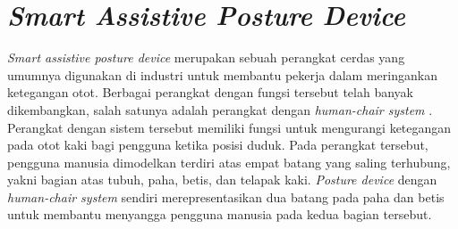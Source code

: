 \section{\emph{Smart Assistive Posture Device}}
\label{sec:assistivedevice}

\emph{Smart assistive posture device} merupakan sebuah perangkat cerdas yang umumnya digunakan di industri untuk membantu pekerja dalam meringankan ketegangan otot.
Berbagai perangkat dengan fungsi tersebut telah banyak dikembangkan,
  salah satunya adalah perangkat dengan \emph{human-chair system} \citep{cit:choi2015}.
Perangkat dengan sistem tersebut memiliki fungsi untuk mengurangi ketegangan pada otot kaki bagi pengguna ketika posisi duduk.
Pada perangkat tersebut,
  pengguna manusia dimodelkan terdiri atas empat batang yang saling terhubung,
  yakni bagian atas tubuh, paha, betis, dan telapak kaki.
\emph{Posture device} dengan \emph{human-chair system} sendiri merepresentasikan dua batang pada paha dan betis untuk membantu menyangga pengguna manusia pada kedua bagian tersebut.
